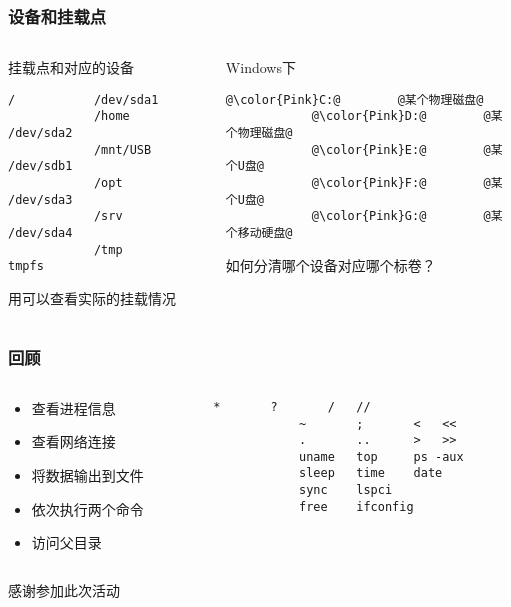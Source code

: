 \begin{CJK}{UTF8}{gbsn}
\begin{frame} [fragile]
	\frametitle{设备和挂载点}
	\linespread{1.5}
	\begin{columns}[T]
		\begin{column}[T]{.5\textwidth}
			挂载点和对应的设备
			\begin{lstlisting}[style=bashstyle, gobble=12, texcl]
			/			/dev/sda1
			/home		/dev/sda2
			/mnt/USB	/dev/sdb1
			/opt		/dev/sda3
			/srv		/dev/sda4
			/tmp		tmpfs
			\end{lstlisting}
			用可以查看实际的挂载情况
		\end{column}
		\begin{column}[T]{.5\textwidth}
			Windows下
			\begin{lstlisting}[style=bashstyle, gobble=12, texcl, escapechar=@]
			@\color{Pink}C:@		@某个物理磁盘@
			@\color{Pink}D:@		@某个物理磁盘@
			@\color{Pink}E:@		@某个U盘@
			@\color{Pink}F:@		@某个U盘@
			@\color{Pink}G:@		@某个移动硬盘@
			\end{lstlisting}
			如何分清哪个设备对应哪个标卷？
		\end{column}
	\end{columns}
\end{frame}

\begin{frame} [fragile]
	\frametitle{回顾}
	\linespread{1.5}
	\begin{columns}[T]
		\begin{column}[T]{.5\textwidth}
			\begin{itemize}
			\item 查看进程信息
			\item 查看网络连接
			\item 将数据输出到文件
			\item 依次执行两个命令
			\item 访问父目录
			\end{itemize}
		\end{column}
		\begin{column}[T]{.5\textwidth}
			\begin{lstlisting}[style=bashstyle, gobble=12, texcl]
			*		?		/	//
			~		;		<	<<
			.		..		>	>>
			uname	top		ps -aux
			sleep	time	date
			sync	lspci
			free	ifconfig
			\end{lstlisting}
		\end{column}
	\end{columns}
\end{frame}

\PreLastFrame
\begin{frame}
	\centerline{\fontsize{32}{32}\selectfont 感谢参加此次活动}
\end{frame}

\newpage
\end{CJK}


